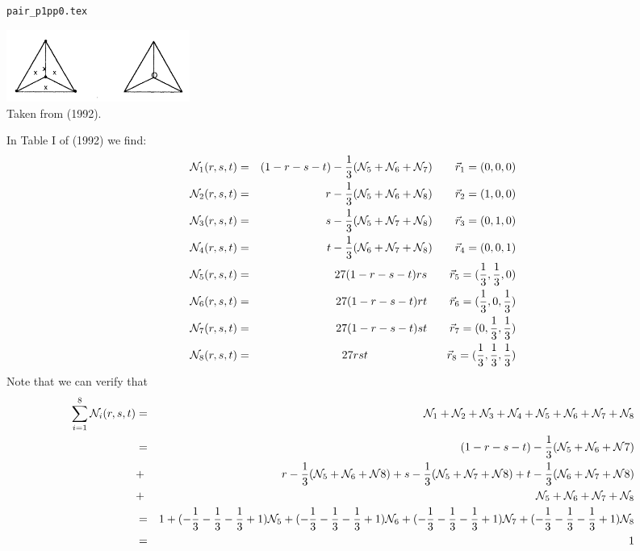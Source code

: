 \begin{flushright} {\tiny {\color{gray} \tt pair\_p1pp0.tex}} \end{flushright}

\begin{center}
\includegraphics[width=6cm]{images/pair_p1pp0/p1pp0}\\
{\captionfont Taken from \textcite{begt92} (1992).}
\end{center}

In Table I of \textcite{begt92} (1992) we find:
\begin{eqnarray}
{\mathcal{N}}_1(r,s,t) &=& (1-r-s-t)-\frac13 ({\mathcal{N}}_5+{\mathcal{N}}_6+{\mathcal{N}}_7) \qquad \vec{r}_1=(0,0,0) \nonumber\\
{\mathcal{N}}_2(r,s,t) &=& r-\frac13 ({\mathcal{N}}_5+{\mathcal{N}}_6+{\mathcal{N}}_8)         \qquad \vec{r}_2=(1,0,0) \nonumber\\
{\mathcal{N}}_3(r,s,t) &=& s-\frac13 ({\mathcal{N}}_5+{\mathcal{N}}_7+{\mathcal{N}}_8)         \qquad \vec{r}_3=(0,1,0) \nonumber\\
{\mathcal{N}}_4(r,s,t) &=& t-\frac13 ({\mathcal{N}}_6+{\mathcal{N}}_7+{\mathcal{N}}_8)         \qquad \vec{r}_4=(0,0,1) \nonumber\\
{\mathcal{N}}_5(r,s,t) &=& 27(1-r-s-t)rs          \qquad \vec{r}_5=(\frac13,\frac13,0) \nonumber\\
{\mathcal{N}}_6(r,s,t) &=& 27(1-r-s-t)rt          \qquad \vec{r}_6=(\frac13,0,\frac13) \nonumber\\
{\mathcal{N}}_7(r,s,t) &=& 27(1-r-s-t)st          \qquad \vec{r}_7=(0,\frac13,\frac13) \nonumber\\
{\mathcal{N}}_8(r,s,t) &=& 27rst  \qquad\qquad\qquad\quad \vec{r}_8=(\frac13,\frac13,\frac13) 
\end{eqnarray}
Note that we can verify that
\begin{eqnarray}
\sum_{i=1}^8 {\mathcal{N}}_i(r,s,t) 
&=& {\mathcal{N}}_1 +{\mathcal{N}}_2 +{\mathcal{N}}_3 +{\mathcal{N}}_4 +{\mathcal{N}}_5 +{\mathcal{N}}_6 +{\mathcal{N}}_7 +{\mathcal{N}}_8 \nonumber\\
&=& (1-r-s-t)-\frac13 ({\mathcal{N}}_5+{\mathcal{N}}_6+{\mathcal{N}}7) \nonumber\\
&+& r-\frac13 ({\mathcal{N}}_5+{\mathcal{N}}_6+{\mathcal{N}}8)  
 +  s-\frac13 ({\mathcal{N}}_5+{\mathcal{N}}_7+{\mathcal{N}}8) 
 +  t-\frac13 ({\mathcal{N}}_6+{\mathcal{N}}_7+{\mathcal{N}}8) \nonumber\\
&+& {\mathcal{N}}_5 + {\mathcal{N}}_6 + {\mathcal{N}}_7 + {\mathcal{N}}_8  \nonumber\\
&=& 1
+(-\frac13 -\frac13 -\frac13+1){\mathcal{N}}_5
+(-\frac13 -\frac13 -\frac13+1){\mathcal{N}}_6
+(-\frac13 -\frac13 -\frac13+1){\mathcal{N}}_7
+(-\frac13 -\frac13 -\frac13+1){\mathcal{N}}_8 \nonumber\\
&=& 1
\end{eqnarray}



